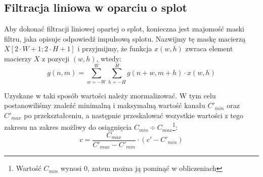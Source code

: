 \documentclass{classrep}
\begin{document}
\subsection{Filtracja liniowa w oparciu o splot}
Aby dokonać filtracji liniowej opartej o splot, konieczna jest znajomość maski filtru, jaka opisuje odpowiedź impulsową splotu. Nazwijmy tę maskę macierzą $X[2 \cdot W + 1; 2 \cdot H + 1]$ i przyjmijmy, że funkcja $x(w, h)$ zwraca element macierzy $X$ z pozycji $(w, h)$, wtedy:
\begin{equation}
 g(n, m) = \displaystyle \sum \limits_{w=-W}^W \displaystyle \sum \limits_{h=-H}^H g(n + w, m + h) \cdot x(w, h)
\end{equation}

Uzyskane w taki sposób wartości należy znormalizować. W tym celu postanowiliśmy znaleźć minimalną i maksymalną wartość kanału $C'_{min}$ oraz $C'_{max}$ po przekształceniu, a następnie przeskalować wszystkie wartości z tego zakresu na zakres możliwy do osiągnięcia $C_{min} \div C_{max}$\footnote{Wartość $C_{min}$ wynosi 0, zatem można ją pominąć w obliczeniach}:
\begin{equation}
 c = \frac{C_{max}}{C'_{max} - C'_{min}} \cdot (c' - C'_{min})
\end{equation}


\begin{thebibliography}{99}
\end{thebibliography}
\end{document}
